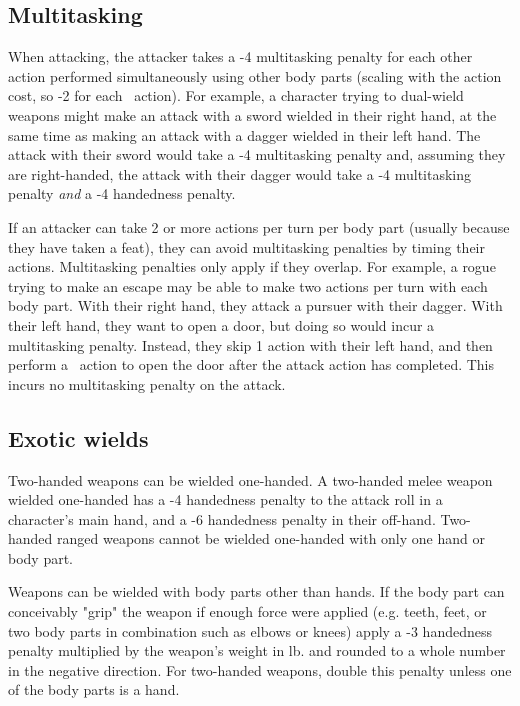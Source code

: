 \begin{multicols*}{2}
    \subsection{Multitasking}\label{combat:multitasking}
    When attacking, the attacker takes a -4 multitasking penalty for each other
    action performed simultaneously using other body parts (scaling with the
    action cost, so -2 for each \textonehalf\ action). For example, a character
    trying to dual-wield weapons might make an attack
    with a sword wielded in their right hand, at the same time as making an
    attack with a dagger wielded in their left hand. The attack with their
    sword would take a -4 multitasking penalty and, assuming they are
    right-handed, the attack with their dagger would take a -4 multitasking
    penalty \textit{and} a -4 handedness penalty.

    If an attacker can take 2 or more actions per turn per body part (usually
    because they have taken a feat), they can avoid multitasking penalties by
    timing their actions. Multitasking penalties only apply if they overlap.
    For example, a rogue trying to make an escape may be able to make two
    actions per turn with each body part. With their right hand, they attack
    a pursuer with their dagger. With their left hand, they want to open a
    door, but doing so would incur a multitasking penalty. Instead, they skip
    1 action with their left hand, and then perform a \textonehalf\ action to
    open the door after the attack action has completed. This incurs no
    multitasking penalty on the attack.

    \subsection{Exotic wields}
    Two-handed weapons can be wielded one-handed. A two-handed melee weapon
    wielded one-handed has a -4 handedness penalty to the attack roll in a
    character's main hand, and a -6 handedness penalty in their off-hand.
    Two-handed ranged weapons cannot be wielded one-handed with only one hand
    or body part.

    Weapons can be wielded with body parts other than hands. If the body part
    can conceivably "grip" the weapon if enough force were applied (e.g. teeth,
    feet, or two body parts in combination such as elbows or knees) apply a -3
    handedness penalty multiplied by the weapon's weight in lb. and rounded to
    a whole number in the negative direction. For two-handed weapons, double
    this penalty unless one of the body parts is a hand.


\end{multicols*}
